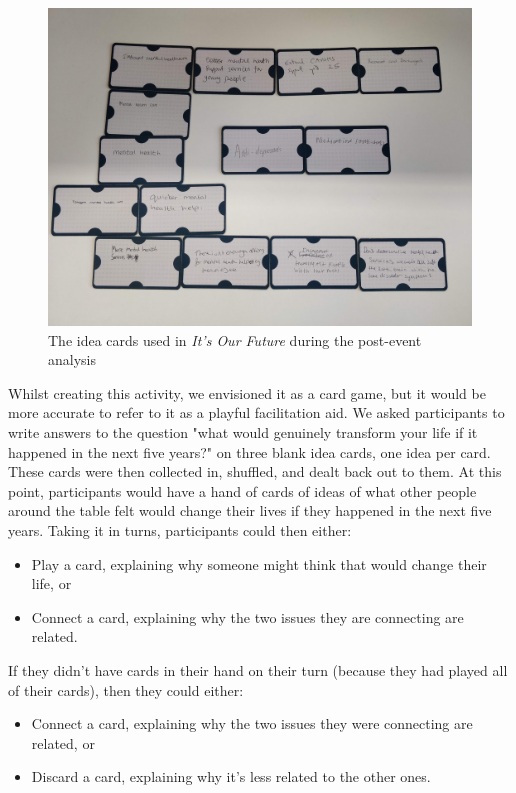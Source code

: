 \begin{figure}
    \centering
    \includegraphics[width=1\linewidth]{Images/7/idea-cards.jpeg}
    \caption{The idea cards used in \textit{It's Our Future} during the post-event analysis}
    \label{fig:idea-cards}
\end{figure}

Whilst creating this activity, we envisioned it as a card game, but it would be more accurate to refer to it as a playful facilitation aid. We asked participants to write answers to the question "what would genuinely transform your life if it happened in the next five years?" on three blank idea cards, one idea per card. These cards were then collected in, shuffled, and dealt back out to them. At this point, participants would have a hand of cards of ideas of what other people around the table felt would change their lives if they happened in the next five years. Taking it in turns, participants could then either:
\begin{itemize}
    \item Play a card, explaining why someone might think that would change their life, or
    \item Connect a card, explaining why the two issues they are connecting are related.
\end{itemize}
If they didn’t have cards in their hand on their turn (because they had played all of their cards), then they could either:

\begin{itemize}
    \item Connect a card, explaining why the two issues they were connecting are related, or
    \item Discard a card, explaining why it’s less related to the other ones.
\end{itemize}

